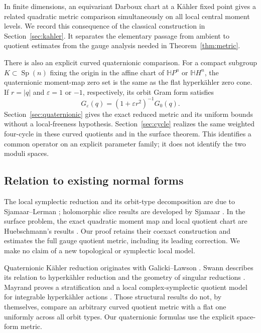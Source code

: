 \documentclass[11pt]{amsart}
\theoremstyle{definition}
\theoremstyle{remark}
\newcommand{\Hh}{\mathbb H}
\newcommand{\Sp}{\operatorname{Sp}}
\begin{document}
In finite dimensions, an equivariant Darboux chart at a Kähler fixed
point gives a related quadratic metric comparison simultaneously on
all local central moment levels. We record this consequence of the
classical construction in Section~\ref{sec:kahler}. It separates the
elementary passage from ambient to quotient estimates from the gauge
analysis needed in Theorem~\ref{thm:metric}.

There is also an explicit curved quaternionic comparison. For a compact
subgroup $K\subset\Sp(n)$ fixing the origin in the affine chart of
$\Hh P^n$ or $\Hh H^n$, the quaternionic moment-map zero set is the
same as the flat hyperkähler zero cone. If $r=|q|$ and
$\varepsilon=1$ or $-1$, respectively, its orbit Gram form satisfies
\begin{equation}\label{eq:introqk}
 G_\varepsilon(q)=(1+\varepsilon r^2)^{-1}G_0(q).
\end{equation}
Section~\ref{sec:quaternionic} gives the exact reduced metric and its
uniform bounds without a local-freeness hypothesis. Section~\ref{sec:cycle}
realizes the same weighted four-cycle in these curved quotients and in
the surface theorem. This identifies a common operator on an explicit
parameter family; it does not identify the two moduli spaces.

\subsection{Relation to existing normal forms}
The local symplectic reduction and its orbit-type decomposition are
due to Sjamaar--Lerman \cite{SL91}; holomorphic slice results are
developed by Sjamaar \cite{Sja95}. In the surface problem, the exact
quadratic moment map and local quotient chart are Huebschmann's
results \cite[Theorems 2.24 and 2.32]{Hue95}. Our proof retains their
coexact construction and estimates the full gauge quotient metric,
including its leading correction. We make no claim of a new
topological or symplectic local model.

Quaternionic Kähler reduction originates with Galicki--Lawson
\cite{GL88}. Swann describes its relation to hyperkähler reduction
\cite{Swa90} and the geometry of singular reductions \cite{Swa97}.
Mayrand proves a stratification and a local
complex-symplectic quotient model for integrable hyperkähler actions
\cite[Theorems 1.2--1.4]{May22}. Those structural results do not,
by themselves, compare an arbitrary curved quotient metric with a
flat one uniformly across all orbit types. Our quaternionic formulas
use the explicit space-form metric.
\end{document}
